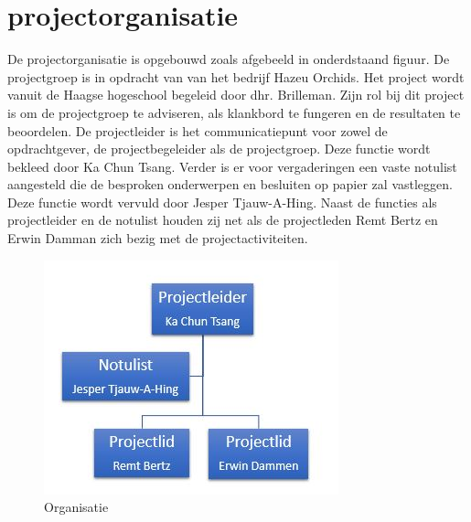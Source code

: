 \section{projectorganisatie}

De projectorganisatie is opgebouwd zoals afgebeeld in onderdstaand figuur. De projectgroep is in opdracht van van het bedrijf Hazeu Orchids.
Het project wordt vanuit de Haagse hogeschool begeleid door dhr. Brilleman. Zijn rol bij
dit project is om de projectgroep te adviseren, als klankbord te fungeren en de resultaten
te beoordelen. De projectleider is het communicatiepunt voor zowel de opdrachtgever, de
projectbegeleider als de projectgroep. Deze functie wordt bekleed door Ka Chun Tsang.
Verder is er voor vergaderingen een vaste notulist aangesteld die de besproken onderwerpen
en besluiten op papier zal vastleggen. Deze functie wordt vervuld door Jesper Tjauw-A-Hing.
Naast de functies als projectleider en de notulist houden zij net als de projectleden Remt Bertz en Erwin Damman zich bezig met de projectactiviteiten.

\begin{figure}[h]
	\centering
	\includegraphics[with=/textwith]{Afbeeldingen/Organisatie.JPG}
	\caption{Organisatie} 
\end{figure}


\newpage